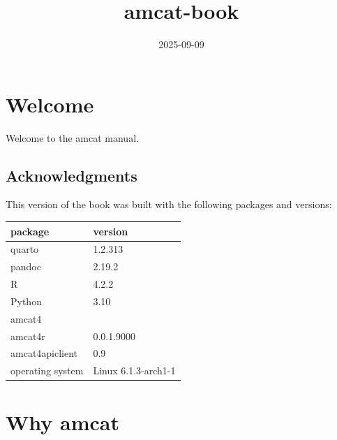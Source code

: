 \documentclass[
  letterpaper,
  DIV=11,
  numbers=noendperiod]{scrreprt}
\title{amcat-book}
\author{}
\date{2025-09-09}
\renewcommand*\contentsname{Table of contents}
\newcommand\contentsname{Table of contents}
\begin{document}
\maketitle

\renewcommand*\contentsname{Table of contents}
{
\hypersetup{linkcolor=}
\setcounter{tocdepth}{2}
\tableofcontents
}


\chapter*{Welcome}\label{welcome}


Welcome to the amcat manual.

\section*{Acknowledgments}\label{acknowledgments}


This version of the book was built with the following packages and
versions:

\begin{longtable}[]{@{}ll@{}}
\toprule\noalign{}
package & version \\
\midrule\noalign{}
\endhead
\bottomrule\noalign{}
\endlastfoot
quarto & 1.2.313 \\
pandoc & 2.19.2 \\
R & 4.2.2 \\
Python & 3.10 \\
amcat4 & \\
amcat4r & 0.0.1.9000 \\
amcat4apiclient & 0.9 \\
operating system & Linux 6.1.3-arch1-1 \\
\end{longtable}


\chapter{Why amcat}\label{why-amcat}
\end{document}
